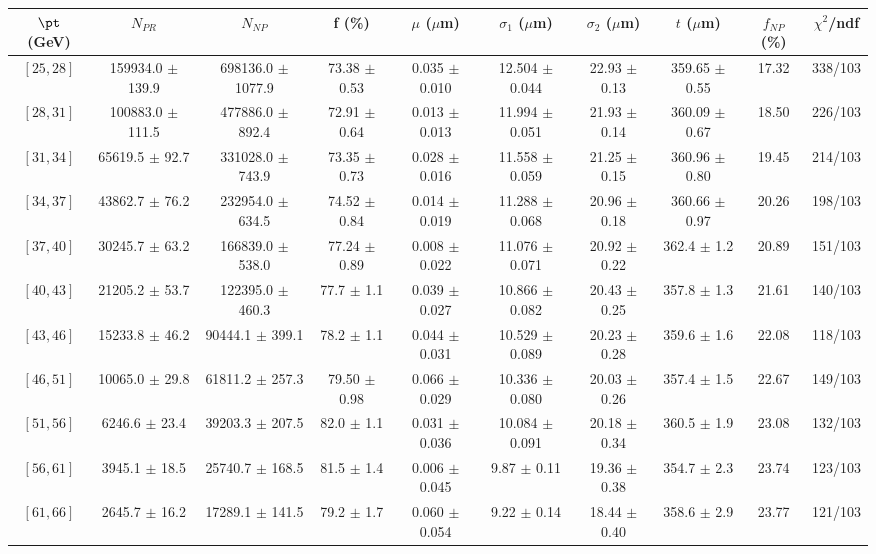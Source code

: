 \begin{tabular}{c||c|c|c|c|c|c|c||c|c}
$\pt$ (GeV) & $N_{PR}$ & $N_{NP}$ & f (\%) & $\mu$ ($\mu$m) & $\sigma_1$ ($\mu$m) & $\sigma_2$ ($\mu$m)  & $t$ ($\mu$m) & $f_{NP}$ (\%) & $\chi^2$/ndf \\
\hline
$[25, 28]$ & 159934.0 $\pm$ 139.9 & 698136.0 $\pm$ 1077.9 & 73.38 $\pm$ 0.53 & 0.035 $\pm$ 0.010 & 12.504 $\pm$ 0.044 & 22.93 $\pm$ 0.13 & 359.65 $\pm$ 0.55 & 17.32 & 338/103\\
$[28, 31]$ & 100883.0 $\pm$ 111.5 & 477886.0 $\pm$ 892.4 & 72.91 $\pm$ 0.64 & 0.013 $\pm$ 0.013 & 11.994 $\pm$ 0.051 & 21.93 $\pm$ 0.14 & 360.09 $\pm$ 0.67 & 18.50 & 226/103\\
$[31, 34]$ & 65619.5 $\pm$ 92.7 & 331028.0 $\pm$ 743.9 & 73.35 $\pm$ 0.73 & 0.028 $\pm$ 0.016 & 11.558 $\pm$ 0.059 & 21.25 $\pm$ 0.15 & 360.96 $\pm$ 0.80 & 19.45 & 214/103\\
$[34, 37]$ & 43862.7 $\pm$ 76.2 & 232954.0 $\pm$ 634.5 & 74.52 $\pm$ 0.84 & 0.014 $\pm$ 0.019 & 11.288 $\pm$ 0.068 & 20.96 $\pm$ 0.18 & 360.66 $\pm$ 0.97 & 20.26 & 198/103\\
$[37, 40]$ & 30245.7 $\pm$ 63.2 & 166839.0 $\pm$ 538.0 & 77.24 $\pm$ 0.89 & 0.008 $\pm$ 0.022 & 11.076 $\pm$ 0.071 & 20.92 $\pm$ 0.22 & 362.4 $\pm$ 1.2 & 20.89 & 151/103\\
$[40, 43]$ & 21205.2 $\pm$ 53.7 & 122395.0 $\pm$ 460.3 & 77.7 $\pm$ 1.1 & 0.039 $\pm$ 0.027 & 10.866 $\pm$ 0.082 & 20.43 $\pm$ 0.25 & 357.8 $\pm$ 1.3 & 21.61 & 140/103\\
$[43, 46]$ & 15233.8 $\pm$ 46.2 & 90444.1 $\pm$ 399.1 & 78.2 $\pm$ 1.1 & 0.044 $\pm$ 0.031 & 10.529 $\pm$ 0.089 & 20.23 $\pm$ 0.28 & 359.6 $\pm$ 1.6 & 22.08 & 118/103\\
$[46, 51]$ & 10065.0 $\pm$ 29.8 & 61811.2 $\pm$ 257.3 & 79.50 $\pm$ 0.98 & 0.066 $\pm$ 0.029 & 10.336 $\pm$ 0.080 & 20.03 $\pm$ 0.26 & 357.4 $\pm$ 1.5 & 22.67 & 149/103\\
$[51, 56]$ & 6246.6 $\pm$ 23.4 & 39203.3 $\pm$ 207.5 & 82.0 $\pm$ 1.1 & 0.031 $\pm$ 0.036 & 10.084 $\pm$ 0.091 & 20.18 $\pm$ 0.34 & 360.5 $\pm$ 1.9 & 23.08 & 132/103\\
$[56, 61]$ & 3945.1 $\pm$ 18.5 & 25740.7 $\pm$ 168.5 & 81.5 $\pm$ 1.4 & 0.006 $\pm$ 0.045 & 9.87 $\pm$ 0.11 & 19.36 $\pm$ 0.38 & 354.7 $\pm$ 2.3 & 23.74 & 123/103\\
$[61, 66]$ & 2645.7 $\pm$ 16.2 & 17289.1 $\pm$ 141.5 & 79.2 $\pm$ 1.7 & 0.060 $\pm$ 0.054 & 9.22 $\pm$ 0.14 & 18.44 $\pm$ 0.40 & 358.6 $\pm$ 2.9 & 23.77 & 121/103\\

\end{tabular}
